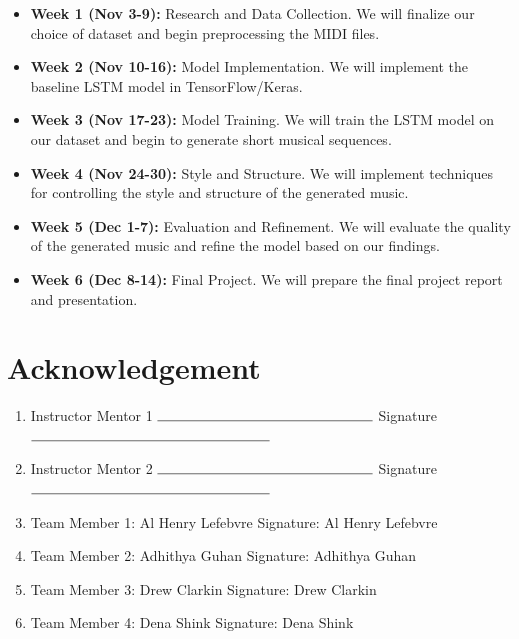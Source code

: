 \documentclass[]{article}
\begin{document}
\begin{itemize}
    \item \textbf{Week 1 (Nov 3-9):} Research and Data Collection. We will finalize our choice of dataset and begin preprocessing the MIDI files.
    \item \textbf{Week 2 (Nov 10-16):} Model Implementation. We will implement the baseline LSTM model in TensorFlow/Keras.
    \item \textbf{Week 3 (Nov 17-23):} Model Training. We will train the LSTM model on our dataset and begin to generate short musical sequences.
    \item \textbf{Week 4 (Nov 24-30):} Style and Structure. We will implement techniques for controlling the style and structure of the generated music.
    \item \textbf{Week 5 (Dec 1-7):} Evaluation and Refinement. We will evaluate the quality of the generated music and refine the model based on our findings.
    \item \textbf{Week 6 (Dec 8-14):} Final Project. We will prepare the final project report and presentation.
\end{itemize}

\section*{Acknowledgement}

\begin{enumerate}[wide,labelwidth=!,labelindent=0pt]
	\vspace{1cm}
	\item[] Instructor Mentor 1 $\rule{5.4cm}{0.15mm}$ \qquad Signature $\rule{6cm}{0.15mm}$ 
	
	\vspace{1cm}
	\item[] Instructor Mentor 2 $\rule{5.4cm}{0.15mm}$ \qquad Signature $\rule{6cm}{0.15mm}$ 
	
	\vspace{1cm}
	\item[] Team Member 1: Al Henry Lefebvre \hfill Signature: Al Henry Lefebvre 
	
	\vspace{1cm}
	\item[] Team Member 2: Adhithya Guhan \hfill Signature: Adhithya Guhan 
	
	\vspace{1cm}
	\item[] Team Member 3: Drew Clarkin \hfill Signature: Drew Clarkin
	
	\vspace{1cm}
	\item[] Team Member 4: Dena Shink \hfill Signature: Dena Shink
	
	
\end{enumerate}
\end{document}
